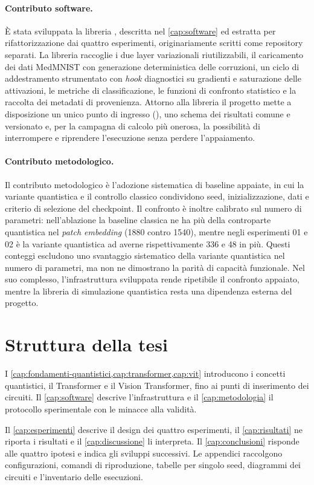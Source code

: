 \paragraph{Contributo software.} È stata sviluppata la libreria
, descritta nel \cref{cap:software} ed estratta per
rifattorizzazione dai quattro esperimenti, originariamente scritti come repository
separati. La libreria raccoglie i due layer variazionali riutilizzabili, il
caricamento dei dati MedMNIST con generazione deterministica delle corruzioni, un
ciclo di addestramento strumentato con \emph{hook} diagnostici su gradienti e
saturazione delle attivazioni, le metriche di classificazione, le funzioni di
confronto statistico e la raccolta dei metadati di provenienza. Attorno alla
libreria il progetto mette a disposizione un unico punto di ingresso
(), uno schema dei risultati comune e versionato e, per la campagna
di calcolo più onerosa, la possibilità di interrompere e riprendere l'esecuzione
senza perdere l'appaiamento.

\paragraph{Contributo metodologico.} Il contributo metodologico è l'adozione
sistematica di baseline appaiate, in cui la variante quantistica e il controllo
classico condividono seed, inizializzazione, dati e criterio di selezione del
checkpoint. Il confronto è inoltre calibrato sul numero di parametri: nell'ablazione
la baseline classica ne ha più della controparte quantistica nel \emph{patch
embedding} (\num{1880} contro \num{1540}), mentre negli esperimenti 01 e 02 è la
variante quantistica ad averne rispettivamente 336 e 48 in più. Questi conteggi
escludono uno svantaggio sistematico della variante quantistica nel numero di
parametri, ma non ne dimostrano la parità di capacità funzionale. Nel suo
complesso, l'infrastruttura sviluppata rende ripetibile il confronto appaiato,
mentre la libreria di simulazione quantistica resta una dipendenza esterna del
progetto.

\section{Struttura della tesi}
\label{sec:struttura}

I \cref{cap:fondamenti-quantistici,cap:transformer,cap:vit} introducono i concetti
quantistici, il Transformer e il Vision Transformer, fino ai punti di inserimento
dei circuiti. Il \cref{cap:software} descrive l'infrastruttura e il
\cref{cap:metodologia} il protocollo sperimentale con le minacce alla validità.

Il \cref{cap:esperimenti} descrive il design dei quattro esperimenti, il
\cref{cap:risultati} ne riporta i risultati e il \cref{cap:discussione} li
interpreta. Il
\cref{cap:conclusioni} risponde alle quattro ipotesi e indica gli sviluppi
successivi. Le appendici raccolgono configurazioni, comandi di riproduzione,
tabelle per singolo seed, diagrammi dei circuiti e l'inventario delle esecuzioni.

